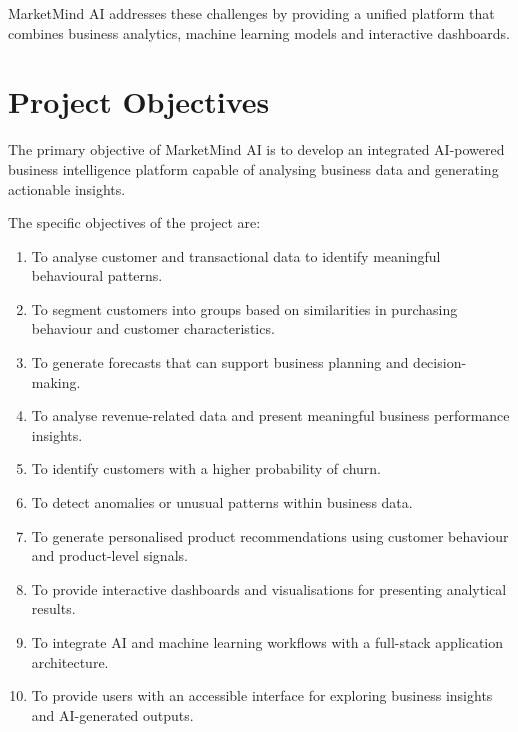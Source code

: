 \documentclass[12pt,a4paper]{report}
\begin{document}
MarketMind AI addresses these challenges by providing a unified
platform that combines business analytics, machine learning models
and interactive dashboards.



\section{Project Objectives}

The primary objective of MarketMind AI is to develop an integrated
AI-powered business intelligence platform capable of analysing
business data and generating actionable insights.

The specific objectives of the project are:

\begin{enumerate}[label=\arabic*.]

    \item To analyse customer and transactional data to identify
    meaningful behavioural patterns.

    \item To segment customers into groups based on similarities in
    purchasing behaviour and customer characteristics.

    \item To generate forecasts that can support business planning
    and decision-making.

    \item To analyse revenue-related data and present meaningful
    business performance insights.

    \item To identify customers with a higher probability of churn.

    \item To detect anomalies or unusual patterns within business
    data.

    \item To generate personalised product recommendations using
    customer behaviour and product-level signals.

    \item To provide interactive dashboards and visualisations for
    presenting analytical results.

    \item To integrate AI and machine learning workflows with a
    full-stack application architecture.

    \item To provide users with an accessible interface for exploring
    business insights and AI-generated outputs.

\end{enumerate}
\end{document}
